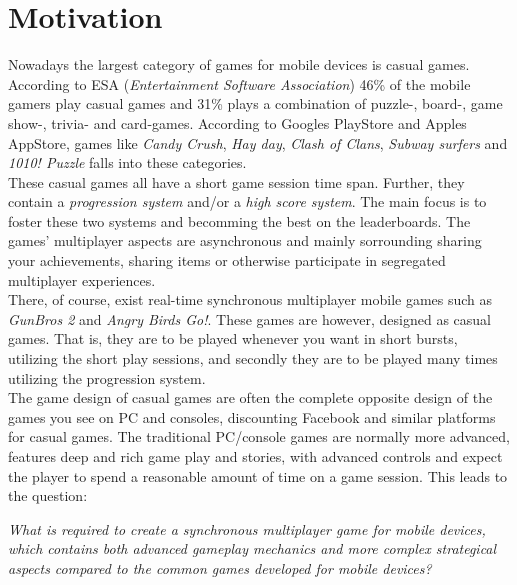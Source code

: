 \section{Motivation} \label{sec:motivation}
Nowadays the largest category of games for mobile devices is casual games. According to ESA\cite{ESA}\cite{ESApdf} (\textit{Entertainment Software Association}) 46\% of the mobile gamers play casual games and 31\% plays a combination of puzzle-, board-, game show-, trivia- and card-games. 
According to Googles PlayStore \cite{googleplay} and Apples AppStore\cite{appstore}, games like \textit{Candy Crush}, \textit{Hay day}, \textit{Clash of Clans}, \textit{Subway surfers} and \textit{1010! Puzzle} falls into these categories.\\

These casual games all have a short game session time span. Further, they contain a \textit{progression system} and/or a \textit{high score system}. The main focus is to foster these two systems and becomming the best on the leaderboards. The games' multiplayer aspects are asynchronous and mainly sorrounding sharing your achievements, sharing items or otherwise participate in segregated multiplayer experiences.\\

There, of course, exist real-time synchronous multiplayer mobile games such as \textit{GunBros 2} and \textit{Angry Birds Go!}. These games are however, designed as casual games. That is, they are to be played whenever you want in short bursts, utilizing the short play sessions, and secondly they are to be played many times utilizing the progression system.\\

The game design of casual games are often the complete opposite design of the games you see on PC and consoles, discounting Facebook and similar platforms for casual games. The traditional PC/console games are normally more advanced, features deep and rich game play and stories, with advanced controls and expect the player to spend a reasonable amount of time on a game session. This leads to the question:
\begin{center}
\textit{What is required to create a synchronous multiplayer game for mobile devices, which contains both advanced gameplay mechanics and more complex strategical aspects compared to the common games developed for mobile devices?}
\end{center}

